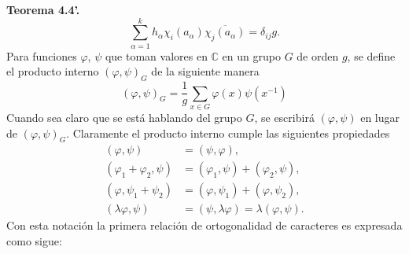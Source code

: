 \documentclass[12pt]{book}
\theoremstyle{definition}
\newcounter{in}
\begin{document}
\textbf{Teorema 4.4'. }
\begin{equation*}
\sum_{\alpha=1}^{k} h_{\alpha} \chi_{i}(a_{\alpha}) \overline{\chi_{j}(a_{\alpha})} = \delta_{ij}g.
\end{equation*}
Para funciones $\varphi$, $\psi$ que toman valores en $\mathbb{C}$ en
un grupo $G$ de orden $g$, se define el producto interno
$(\varphi,\psi)_{G}$ de la siguiente manera
\begin{equation*}
(\varphi,\psi)_{G} = \frac{1}{g} \sum_{x \in G} \varphi(x) \psi(x^{-1})
\end{equation*}
Cuando sea claro que se está hablando del grupo $G$, se escribirá
$(\varphi,\psi)$ en lugar de $(\varphi,\psi)_{G}$. Claramente el
producto interno cumple las siguientes propiedades
\begin{equation*}
  \begin{aligned}
    (\varphi,\psi) &= (\psi,\varphi), \\
    (\varphi_{1}+\varphi_{2},\psi) &= (\varphi_{1},\psi)+(\varphi_{2},\psi), \\
    (\varphi,\psi_{1}+\psi_{2}) &= (\varphi,\psi_{1})+(\varphi,\psi_{2}), \\
    (\lambda \varphi,\psi) &= (\psi,\lambda \varphi)=\lambda (\varphi,\psi).
    \end{aligned}
\end{equation*}
Con esta notación la primera relación de ortogonalidad de caracteres
es expresada como sigue:
\end{document}
